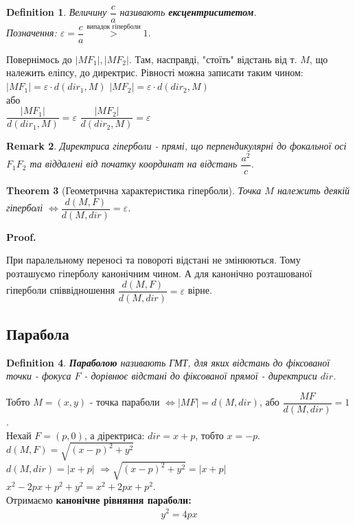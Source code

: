 \documentclass[a4paper, 10pt]{extarticle}
\makeatletter
\def\qed{$\blacksquare$}
\def\qed{$\blacksquare$}
\theoremstyle{theoremdd}
\newtheorem{theorem}{Theorem}[subsection]
\theoremstyle{theoremdd}
\newtheorem{definition}[theorem]{Definition}
\theoremstyle{theoremdd}
\theoremstyle{theoremdd}
\theoremstyle{theoremdd}
\theoremstyle{theoremdd}
\newtheorem{remark}[theorem]{Remark}
\theoremstyle{theoremdd}
\theoremstyle{theoremdd}
\renewenvironment{proof}[1][Proof.\\]{\par
\pushQED{\hfill \qed}%
\normalfont \topsep6\p@\@plus6\p@\relax
\trivlist
\item\relax
{\bfseries
#1\@addpunct{.}}\hspace\labelsep\ignorespaces
}{%
\popQED\endtrivlist\@endpefalse
}
\makeatother
\begin{document}
\begin{definition}
Величину $\dfrac{c}{a}$ називають \textbf{ексцентриситетом}.\\
Позначення: $\varepsilon = \dfrac{c}{a} \overset{\text{випадок гіперболи}}{>} 1$.
\end{definition}

Повернімось до $|MF_1|,|MF_2|$. Там, насправді, "стоїть" \textrm{} відстань від т. $M$, що належить еліпсу, до директрис. Рівності можна записати таким чином:\\
$|MF_1| = \varepsilon \cdot d(dir_1, M)$ \hspace{1cm} $|MF_2| = \varepsilon \cdot d(dir_2, M)$\\
або\\
$\dfrac{|MF_1|}{d(dir_1, M)} = \varepsilon$ \hspace{1cm} $\dfrac{|MF_2|}{d(dir_2, M)} = \varepsilon$

\begin{remark}
Директриса гіперболи - прямі, що перпендикулярні до фокальної осі $F_1F_2$ та віддалені від початку координат на відстань $\dfrac{a^2}{c}$.
\end{remark}

\begin{theorem}[Геометрична характеристика гіперболи]
Точка $M$ належить деякій гіперболі $\iff \dfrac{d(M,F)}{d(M,dir)} = \varepsilon$.
\end{theorem}

\begin{proof}
При паралельному переносі та повороті відстані не змінюються. Тому розташуємо гіперболу канонічним чином. А для канонічно розташованої гіперболи співвідношення $\dfrac{d(M,F)}{d(M,dir)} = \varepsilon$ вірне.
\end{proof}

\subsection{Парабола}
\begin{definition}
\textbf{Параболою} називають ГМТ, для яких відстань до фіксованої точки - фокуса $F$ - дорівнює відстані до фіксованої прямої - директриси $dir$.
\end{definition}

Тобто $M=(x,y)$ - точка параболи $\iff |MF|=d(M,dir)$, або $\dfrac{MF}{d(M,dir)}=1$.
\bigskip \\
Нехай $F = (p,0)$, а діректриса: $dir = x + p$, тобто $x = -p$.\\
$d(M,F)=\sqrt{(x-p)^2+y^2}$\\
$d(M,dir)=|x+p|$
$\Rightarrow \sqrt{(x-p)^2+y^2}=|x+p|$\\
$x^2-2px+p^2+y^2=x^2+2px+p^2$.\\
Отримаємо \textbf{канонічне рівняння параболи:}
\begin{align*}
y^2 = 4px
\end{align*}
\end{document}
